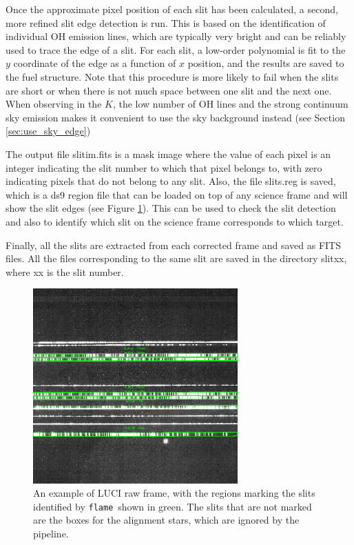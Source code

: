 \documentclass[a4paper, notitlepage]{article}
\newcommand{\flame}{\texttt{flame}}
\begin{document}
Once the approximate pixel position of each slit has been calculated, a second, more refined slit edge detection is run. This is based on the identification of individual OH emission lines, which are typically very bright and can be reliably used to trace the edge of a slit. For each slit, a low-order polynomial is fit to the $y$ coordinate of the edge as a function of $x$ position, and the results are saved to the fuel structure. Note that this procedure is more likely to fail when the slits are short or when there is not much space between one slit and the next one. When observing in the $K$, the low number of OH lines and the strong continuum sky emission makes it convenient to use the sky background instead (see Section \ref{sec:use_sky_edge})

The output file slitim.fits is a mask image where the value of each pixel is an integer indicating the slit number to which that pixel belongs to, with zero indicating pixels that do not belong to any slit. Also, the file slits.reg is saved, which is a ds9 region file that can be loaded on top of any science frame and will show the slit edges (see Figure \ref{fig:slits}). This can be used to check the slit detection and also to identify which slit on the science frame corresponds to which target.

Finally, all the slits are extracted from each corrected frame and saved as FITS files. All the files corresponding to the same slit are saved in the directory slitxx, where xx is the slit number.

\begin{figure}[htbp]
\centering
\includegraphics[width=0.7\textwidth]{slits}
\caption{An example of LUCI raw frame, with the regions marking the slits identified by \flame\ shown in green. The slits that are not marked are the boxes for the alignment stars, which are ignored by the pipeline.}
\label{fig:slits}
\end{figure}
\end{document}
